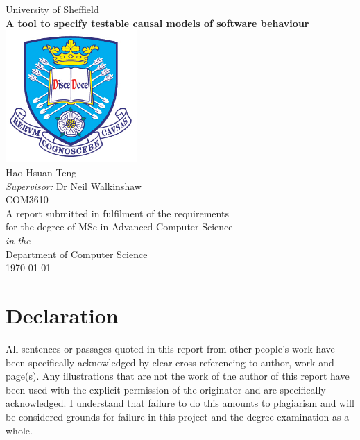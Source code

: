 \documentclass[11pt,oneside]{book}
\begin{document}
\frontmatter

\begin{titlepage}

\begin{center}
{\LARGE University of Sheffield}\\[1.5cm]
\linespread{1.2}\huge {\bfseries A tool to specify testable causal models of software behaviour}\\[1.5cm]
\linespread{1}
\includegraphics[width=5cm]{images/tuoslogo.png}\\[1cm]
{\Large Hao-Hsuan Teng}\\[1cm]
{\large \emph{Supervisor:} Dr Neil Walkinshaw}\\[1cm]
{\Large COM3610}\\[1cm]
\large A report submitted in fulfilment of the requirements\\ for the degree of MSc in Advanced Computer Science\\[0.3cm] 
\textit{in the}\\[0.3cm]
Department of Computer Science\\[2cm]
\today
\end{center}

\end{titlepage}


\newpage
\chapter*{\Large Declaration}


All sentences or passages quoted in this report from other people's work have been specifically acknowledged by clear cross-referencing to author, work and page(s). Any illustrations that are not the work of the author of this report have been used with the explicit permission of the originator and are specifically acknowledged. I understand that failure to do this amounts to plagiarism and will be considered grounds for failure in this project and the degree examination as a whole.\\[1cm]
\end{document}
